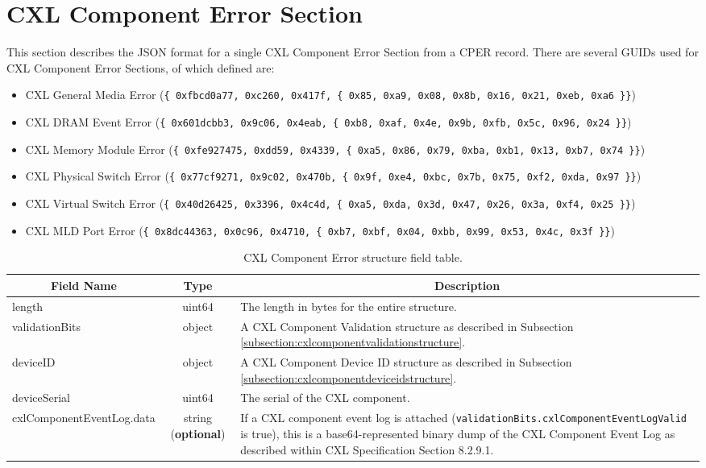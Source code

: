 \documentclass{report}
\newcommand*{\thead}[1]{\multicolumn{1}{|c|}{\bfseries #1}}
\newcommand*{\jsontable}[1]{
    \begin{table}[!ht]
    \label{#1}
    \centering
    \begin{adjustbox}{center}
    \begin{tabular}{|l|c|p{8cm}|}
    \hline
    \thead{Field Name} & \thead{Type} & \thead{Description} \\
    \hline
}
\newcommand*{\jsontableend}[1]{
    \hline
    \end{tabular}
    \end{adjustbox}
    \caption{#1}
    \label{table:#1}
    \end{table}
    \FloatBarrier
}
\begin{document}
\section{CXL Component Error Section}
\label{section:cxlcomponenterrorsection}
This section describes the JSON format for a single CXL Component Error Section from a CPER record. There are several GUIDs used for CXL Component Error Sections, of which defined are:\\
\begin{itemize}
    \item CXL General Media Error (\texttt{\{ 0xfbcd0a77, 0xc260, 0x417f, \{ 0x85, 0xa9, 0x08, 0x8b, 0x16, 0x21, 0xeb, 0xa6 \}\}})\\
    \item CXL DRAM Event Error (\texttt{\{ 0x601dcbb3, 0x9c06, 0x4eab, \{ 0xb8, 0xaf, 0x4e, 0x9b, 0xfb, 0x5c, 0x96, 0x24 \}\}})\\
    \item CXL Memory Module Error (\texttt{\{ 0xfe927475, 0xdd59, 0x4339, \{ 0xa5, 0x86, 0x79, 0xba, 0xb1, 0x13, 0xb7, 0x74 \}\}})\\
    \item CXL Physical Switch Error (\texttt{\{ 0x77cf9271, 0x9c02, 0x470b, \{ 0x9f, 0xe4, 0xbc, 0x7b, 0x75, 0xf2, 0xda, 0x97 \}\}})\\
    \item CXL Virtual Switch Error (\texttt{\{ 0x40d26425, 0x3396, 0x4c4d, \{ 0xa5, 0xda, 0x3d, 0x47, 0x26, 0x3a, 0xf4, 0x25 \}\}})\\
    \item CXL MLD Port Error (\texttt{\{ 0x8dc44363, 0x0c96, 0x4710, \{ 0xb7, 0xbf, 0x04, 0xbb, 0x99, 0x53, 0x4c, 0x3f \}\}})\\
\end{itemize}
\jsontable{table:cxlcomponenterrorsection}
length & uint64 & The length in bytes for the entire structure.\\
\hline
validationBits & object & A CXL Component Validation structure as described in Subsection \ref{subsection:cxlcomponentvalidationstructure}.\\
\hline
deviceID & object & A CXL Component Device ID structure as described in Subsection \ref{subsection:cxlcomponentdeviceidstructure}.\\
\hline
deviceSerial & uint64 & The serial of the CXL component.\\
\hline
cxlComponentEventLog.data & string (\textbf{optional}) & If a CXL component event log is attached (\texttt{validationBits.cxlComponentEventLogValid} is true), this is a base64-represented binary dump of the CXL Component Event Log as described within CXL Specification Section 8.2.9.1.\\
\jsontableend{CXL Component Error structure field table.}
\end{document}
